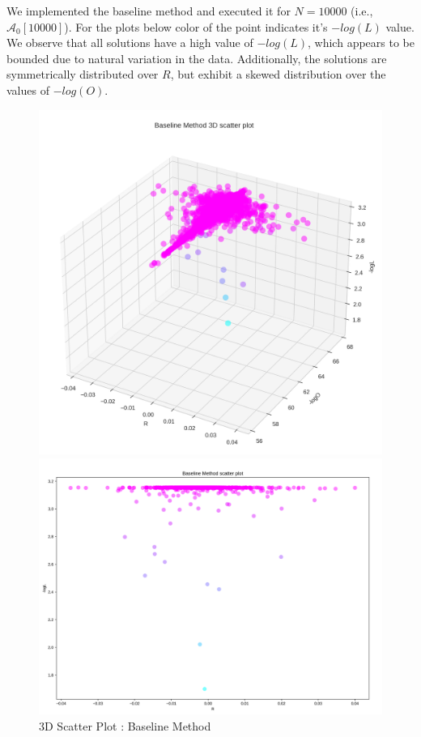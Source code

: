 We implemented the baseline method and executed it for $N=10000$ (i.e., $\mathcal{A}_{0}[10000]$). For the plots below color of the point indicates it's $-log(L)$ value. We observe that all solutions have a high value of $-log(L)$, which appears to be bounded due to natural variation in the data. Additionally, the solutions are symmetrically distributed over $R$, but exhibit a skewed distribution over the values of $-log(O)$.
\begin{figure}[H]
    \centering
    \begin{minipage}[t]{0.45\textwidth}
        \centering
        \includegraphics[width=\textwidth]{images/1-Baseline Method 3D scatter plot.png}
        \captionsetup{font=tiny}
        \caption{3D Scatter Plot : Baseline Method}
        \label{fig:cumulative_returns}
    \end{minipage}%
    \begin{minipage}[t]{0.5511\textwidth}
        \centering
        \includegraphics[width=\textwidth]{images/1-Baseline Method scatter plot_R_vs_-logL.png}

\end{minipage}
\end{figure}
